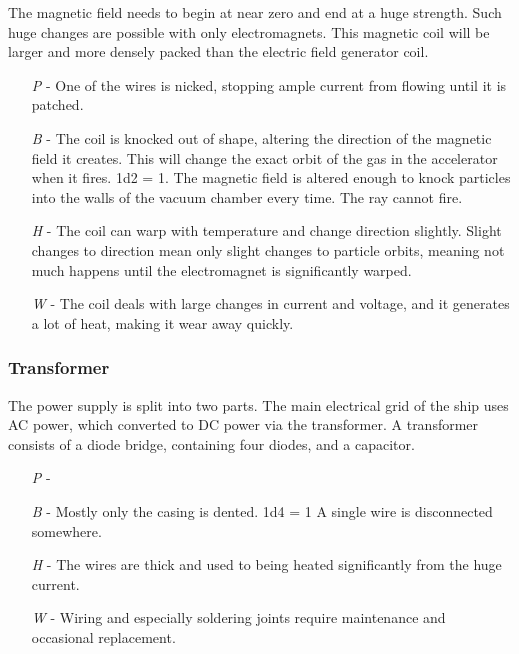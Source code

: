 \documentclass[a4paper]{article}
\begin{document}
The magnetic field needs to begin at near zero and end at a huge strength. Such huge changes are possible with only electromagnets. This magnetic coil will be larger and more densely packed than the electric field generator coil. 
\begin{enumerate}
\item [\textit{P}] - One of the wires is nicked, stopping ample current from flowing until it is patched.
\item [\textit{B}] - The coil is knocked out of shape, altering the direction of the magnetic field it creates. This will change the exact orbit of the gas in the accelerator when it fires. \newline \hspace*{-3pt} 1d2 = 1. The magnetic field is altered enough to knock particles into the walls of the vacuum chamber every time. The ray cannot fire.
\item [\textit{H}] - The coil can warp with temperature and change direction slightly. Slight changes to direction mean only slight changes to particle orbits, meaning not much happens until the electromagnet is significantly warped.
\item [\textit{W}] - The coil deals with large changes in current and voltage, and it generates a lot of heat, making it wear away quickly.
\end{enumerate}

\vspace{-0.5cm} \hspace{-18pt} \subsubsection{Transformer} \label{ray_transformer} \vspace{-0.2cm}
The power supply is split into two parts. The main electrical grid of the ship uses AC power, which converted to DC power via the transformer. A transformer consists of a diode bridge, containing four diodes, and a capacitor.
\begin{enumerate}
\item [\textit{P}] - 
\item [\textit{B}] - Mostly only the casing is dented. \newline \hspace*{3pt} 1d4 = 1 A single wire is disconnected somewhere.
\item [\textit{H}] - The wires are thick and used to being heated significantly from the huge current.
\item [\textit{W}] - Wiring and especially soldering joints require maintenance and occasional replacement.
\end{enumerate}
\end{document}
